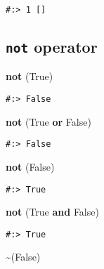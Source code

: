 \documentclass[
]{book}
\newenvironment{Shaded}{\begin{snugshade}}{\end{snugshade}}
\newcommand{\KeywordTok}[1]{\textcolor[rgb]{0.27,0.27,0.27}{\textbf{#1}}}
\newcommand{\NormalTok}[1]{#1}
\newcommand{\OperatorTok}[1]{\textcolor[rgb]{0.43,0.43,0.43}{\textbf{#1}}}
\newcommand{\VariableTok}[1]{\textcolor[rgb]{0,0,0}{#1}}
\begin{document}
\begin{verbatim}
#:> 1 []
\end{verbatim}

\hypertarget{not-operator}{%
\subsection{\texorpdfstring{\texttt{not} operator}{not operator}}\label{not-operator}}

\begin{Shaded}
\begin{Highlighting}[]
\KeywordTok{not}\NormalTok{ (}\VariableTok{True}\NormalTok{)}
\end{Highlighting}
\end{Shaded}

\begin{verbatim}
#:> False
\end{verbatim}

\begin{Shaded}
\begin{Highlighting}[]
\KeywordTok{not}\NormalTok{ (}\VariableTok{True} \KeywordTok{or} \VariableTok{False}\NormalTok{)}
\end{Highlighting}
\end{Shaded}

\begin{verbatim}
#:> False
\end{verbatim}

\begin{Shaded}
\begin{Highlighting}[]
\KeywordTok{not}\NormalTok{ (}\VariableTok{False}\NormalTok{)}
\end{Highlighting}
\end{Shaded}

\begin{verbatim}
#:> True
\end{verbatim}

\begin{Shaded}
\begin{Highlighting}[]
\KeywordTok{not}\NormalTok{ (}\VariableTok{True} \KeywordTok{and} \VariableTok{False}\NormalTok{)}
\end{Highlighting}
\end{Shaded}

\begin{verbatim}
#:> True
\end{verbatim}

\begin{Shaded}
\begin{Highlighting}[]
\OperatorTok{\textasciitilde{}}\NormalTok{(}\VariableTok{False}\NormalTok{)}
\end{Highlighting}
\end{Shaded}
\end{document}
